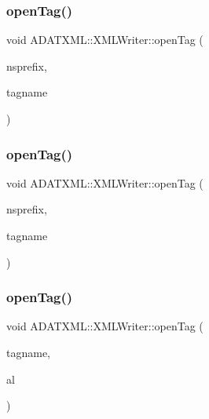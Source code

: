 \subsubsection{\texorpdfstring{openTag()}{openTag()}\hspace{0.1cm}{\footnotesize\ttfamily [5/12]}}
{\footnotesize\ttfamily void A\+D\+A\+T\+X\+M\+L\+::\+X\+M\+L\+Writer\+::open\+Tag (\begin{DoxyParamCaption}\item[{const std\+::string \&}]{nsprefix,  }\item[{const std\+::string \&}]{tagname }\end{DoxyParamCaption})}

\mbox{\label{classADATXML_1_1XMLWriter_aa65d48238c4b08ebcedd534501e7cbaa}} 
\subsubsection{\texorpdfstring{openTag()}{openTag()}\hspace{0.1cm}{\footnotesize\ttfamily [6/12]}}
{\footnotesize\ttfamily void A\+D\+A\+T\+X\+M\+L\+::\+X\+M\+L\+Writer\+::open\+Tag (\begin{DoxyParamCaption}\item[{const std\+::string \&}]{nsprefix,  }\item[{const std\+::string \&}]{tagname }\end{DoxyParamCaption})}

\mbox{\label{classADATXML_1_1XMLWriter_a0d90742225631452502c6716ee737fef}} 
\subsubsection{\texorpdfstring{openTag()}{openTag()}\hspace{0.1cm}{\footnotesize\ttfamily [7/12]}}
{\footnotesize\ttfamily void A\+D\+A\+T\+X\+M\+L\+::\+X\+M\+L\+Writer\+::open\+Tag (\begin{DoxyParamCaption}\item[{const std\+::string \&}]{tagname,  }\item[{\mbox{\hyperlink{namespaceXMLWriterAPI_a28cf3d8051a4ccf0aef208b7ebc66d07}{X\+M\+L\+Writer\+A\+P\+I\+::\+Attribute\+List}} \&}]{al }\end{DoxyParamCaption})}

